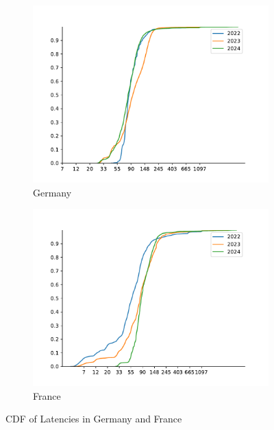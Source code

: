 \begin{figure}
	\centering
	\begin{subfigure}[b]{0.8\linewidth}
		\includegraphics[width=\linewidth]{chapters/4-results/latency/img/cdf_latencies_of_starlink_probes_in_germany.pdf}
		\caption{Germany}
	\end{subfigure}
	\begin{subfigure}[b]{0.8\linewidth}
		\includegraphics[width=\linewidth]{chapters/4-results/latency/img/cdf_latencies_of_starlink_probes_in_france.pdf}
		\caption{France}
	\end{subfigure}
	\caption{CDF of Latencies in Germany and France}
	\label{fig:latency-cdfs-2}
\end{figure}

